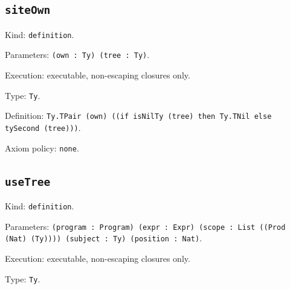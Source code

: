 \documentclass[11pt]{article}
\begin{document}
\subsection*{\texttt{siteOwn}}
\noindent Kind: \texttt{definition}.\par
\noindent Parameters: \texttt{(own : Ty) (tree : Ty)}.\par
\noindent Execution: executable, non-escaping closures only.\par
\noindent Type: \texttt{Ty}.\par
\noindent Definition: \texttt{Ty.TPair (own) ((if isNilTy (tree) then Ty.TNil else tySecond (tree)))}.\par
\noindent Axiom policy: \texttt{none}.\par
\subsection*{\texttt{useTree}}
\noindent Kind: \texttt{definition}.\par
\noindent Parameters: \texttt{(program : Program) (expr : Expr) (scope : List ((Prod (Nat) (Ty)))) (subject : Ty) (position : Nat)}.\par
\noindent Execution: executable, non-escaping closures only.\par
\noindent Type: \texttt{Ty}.\par
\end{document}
